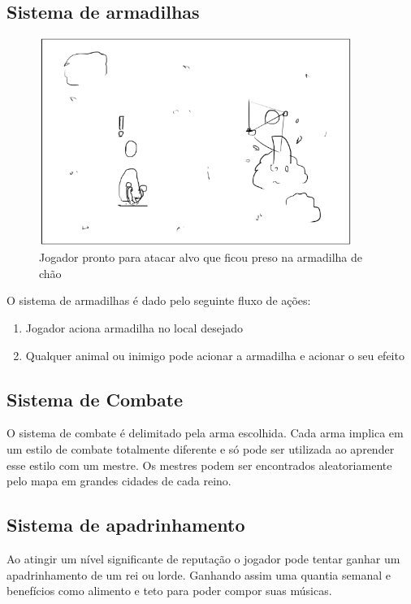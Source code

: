 \documentclass[12pt, 
openright, 
oneside, 
a4paper,    
brazil]{facom-ufu-abntex2}
\begin{document}
\subsection{Sistema de armadilhas}
\begin{figure}[H]
	\centering
	\includegraphics[width=4in]{imagens/mecanica_armadilha.png}
	\caption{Jogador pronto para atacar alvo que ficou preso na armadilha de chão}
\end{figure}
O sistema de armadilhas é dado pelo seguinte fluxo de ações:
\begin{enumerate}  
\item Jogador aciona armadilha no local desejado
\item Qualquer animal ou inimigo pode acionar a armadilha e acionar o seu efeito
\end{enumerate}

\subsection{Sistema de Combate}
O sistema de combate é delimitado pela arma escolhida. Cada arma implica em um estilo
de combate totalmente diferente e só pode ser utilizada ao aprender esse estilo com um
mestre. Os mestres podem ser encontrados aleatoriamente pelo mapa em grandes cidades de 
cada reino.

\subsection{Sistema de apadrinhamento}
Ao atingir um nível significante de reputação o jogador pode tentar ganhar um apadrinhamento de um rei ou lorde. Ganhando assim uma quantia semanal e benefícios como alimento e teto para poder compor suas músicas.
\end{document}
